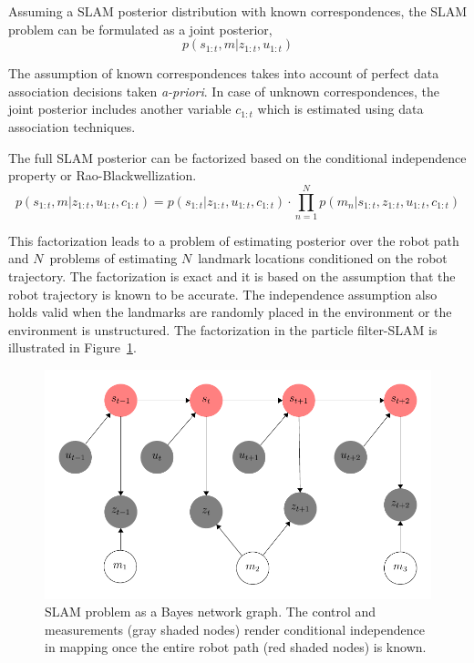 Assuming a SLAM posterior distribution with known correspondences, the SLAM problem can be formulated as a joint posterior,
\begin{equation}
p(s_{1:t},m|z_{1:t},u_{1:t})
\end{equation}

The assumption of known correspondences takes into account of perfect data association decisions taken \textit{a-priori}. In case of unknown correspondences, the joint posterior includes another variable $c_{1:t}$ which is estimated using data association techniques. 

The full SLAM posterior can be factorized based on the conditional independence property or Rao-Blackwellization.
\begin{equation}
p(s_{1:t},m|z_{1:t},u_{1:t},c_{1:t})=p(s_{1:t}|z_{1:t},u_{1:t},c_{1:t})\cdot\prod_{n=1}^N p(m_n|s_{1:t},z_{1:t},u_{1:t},c_{1:t})
\label{rbpf_fastslam}
\end{equation}

This factorization leads to a problem of estimating posterior over the robot path and $N$~problems of estimating $N$~landmark locations conditioned on the robot trajectory. The factorization is exact and it is based on the assumption that the robot trajectory is known to be accurate. The independence assumption also holds valid when the landmarks are randomly placed in the environment or the environment is unstructured. The factorization in the particle filter-SLAM is illustrated in Figure~\ref{FastSLAM_DBN}.
\begin{figure}
\centering
\includegraphics[scale=0.9]{./images/fsm}
\caption[Dynamic Bayesian Network graph of SLAM]{SLAM problem as a Bayes network graph. The control and measurements (gray shaded nodes) render conditional independence in mapping once the entire robot path (red shaded nodes) is known.}
\label{FastSLAM_DBN}
\end{figure}

